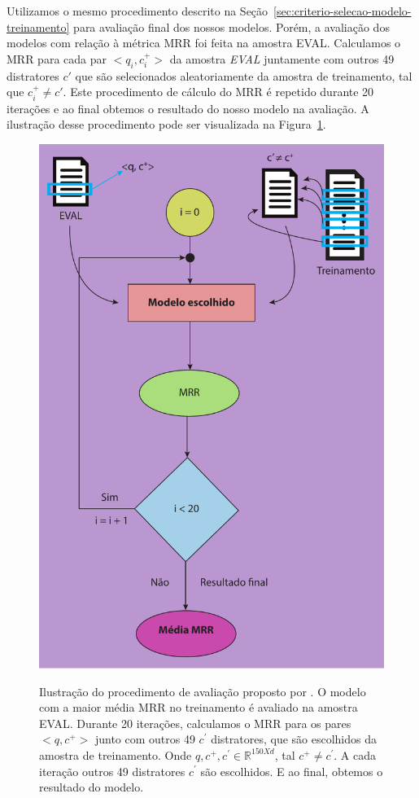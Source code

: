 Utilizamos o mesmo procedimento descrito na Seção~\ref{sec:criterio-selecao-modelo-treinamento} para avaliação final dos nossos modelos. Porém, a avaliação dos modelos com relação à métrica MRR foi feita na amostra EVAL. Calculamos o MRR para cada par $<q_{i}, c_{i}^{+}>$ da amostra \emph{EVAL} juntamente com outros 49 distratores $c'$ que são selecionados aleatoriamente da amostra de treinamento, tal que $c_{i}^{+} \neq c'$. Este procedimento de cálculo do MRR é repetido durante 20 iterações e ao final obtemos o resultado do nosso modelo na avaliação. A ilustração desse procedimento pode ser visualizada na Figura~\ref{fig:final-evaluation-process}.

\begin{figure}[h]
\centering
\caption[Ilustração do procedimento de avaliação proposto por .]{Ilustração do procedimento de avaliação proposto por . O modelo com a maior média MRR no treinamento é avaliado na amostra EVAL. Durante 20 iterações, calculamos o MRR para os pares $<q, c^{+}>$ junto com outros 49 $c^{'}$ distratores, que são escolhidos da amostra de treinamento. Onde $q, c^{+}, c^{'} \in \mathbb{R}^{150 X d}$, tal $c^{+} \neq c^{'}$. A cada iteração outros 49 distratores $c^{'}$ são escolhidos. E ao final, obtemos o resultado do modelo.}
\includegraphics[height=1\textwidth]{figuras/cap-experimento/final_evaluation_process.pdf}
\label{fig:final-evaluation-process}
\end{figure}



